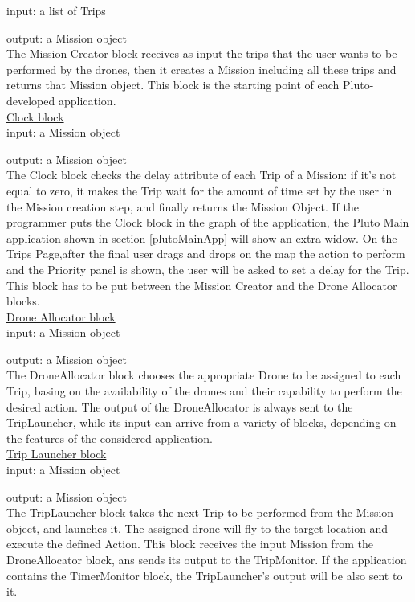 input: a list of Trips

output: a Mission object
\\

The Mission Creator block receives as input the trips that the user wants to be performed by the drones, then it creates a Mission including all these trips and returns that Mission object.
This block is the starting point of each Pluto-developed application.
\\



\underline{Clock block}
\\

input: a Mission object

output: a Mission object
\\

The Clock block checks the delay attribute of each Trip of a Mission: if it's not equal to zero, it makes the Trip wait for the amount of time set by the user in the Mission creation step, and finally returns the Mission Object.
If the programmer puts the Clock block in the graph of the application, the Pluto Main application shown in section \ref{plutoMainApp} will show an extra widow.
On the Trips Page,after the final user drags and drops on the map the action to perform and the Priority panel is shown, the user will be asked to set a delay for the Trip.
This block has to be put between the Mission Creator and the Drone Allocator blocks.
\\

\underline{Drone Allocator block}
\\

input: a Mission object

output: a Mission object
\\

The DroneAllocator block chooses the appropriate Drone to be assigned to each Trip, basing on the availability of the drones and their capability to perform the desired action.
The output of the DroneAllocator is always sent to the TripLauncher, while its input can arrive from a variety of blocks, depending on the features of the considered application.
\\

\underline{Trip Launcher block}
\\

input: a Mission object

output: a Mission object
\\

The TripLauncher block takes the next Trip to be performed from the Mission object, and launches it.
The assigned drone will fly to the target location and execute the defined Action.
This block receives the input Mission from the DroneAllocator block, ans sends its output to the TripMonitor.
If the application contains the TimerMonitor block, the TripLauncher's output will be also sent to it.
\\

